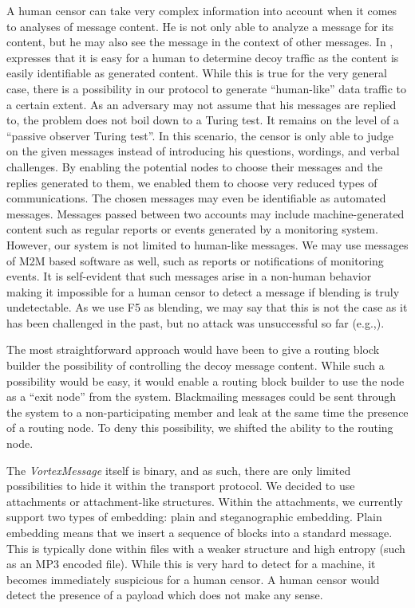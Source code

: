 \documentclass[acmsmall, screen, review]{acmart}
\begin{document}
	A human censor can take very complex information into account when it comes to analyses of message content. He is not only able to analyze a message for its content, but he may also see the message in the context of other messages. In \cite{oakland2013-parrot}, \citeauthor{oakland2013-parrot}  expresses that it is easy for a human to determine decoy traffic as the content is easily identifiable as generated content. While this is true for the very general case, there is a possibility in our protocol to generate ``human-like'' data traffic to a certain extent. As an adversary may not assume that his messages are replied to, the problem does not boil down to a Turing test. It remains on the level of a ``passive observer Turing test''. In this scenario, the censor is only able to judge on the given messages instead of introducing his questions, wordings, and verbal challenges. By enabling the potential nodes to choose their messages and the replies generated to them, we enabled them to choose very reduced types of communications. The chosen messages may even be identifiable as automated messages. Messages passed between two accounts may include machine-generated content such as regular reports or events generated by a monitoring system. However, our system is not limited to human-like messages. We may use messages of M2M based software as well, such as reports or notifications of monitoring events. It is self-evident that such messages arise in a non-human behavior making it impossible for a human censor to detect a message if blending is truly undetectable. As we use F5 as blending, we may say that this is not the case as it has been challenged in the past, but no attack was unsuccessful so far (e.g.,\cite{F5broken}).
	
	The most straightforward approach would have been to give a routing block builder the possibility of controlling the decoy message content. While such a possibility would be easy, it would enable a routing block builder to use the node as a ``exit node'' from the system. Blackmailing messages could be sent through the system to a non-participating member and leak at the same time the presence of a routing node. To deny this possibility, we shifted the ability to the routing node.
	
	The \emph{VortexMessage} itself is binary, and as such, there are only limited possibilities to hide it within the transport protocol. We decided to use attachments or attachment-like structures. Within the attachments, we currently support two types of embedding: plain and steganographic embedding. Plain embedding means that we insert a sequence of blocks into a standard message. This is typically done within files with a weaker structure and high entropy (such as an MP3 encoded file). While this is very hard to detect for a machine, it becomes immediately suspicious for a human censor. A human censor would detect the presence of a payload which does not make any sense.
	
\end{document}
